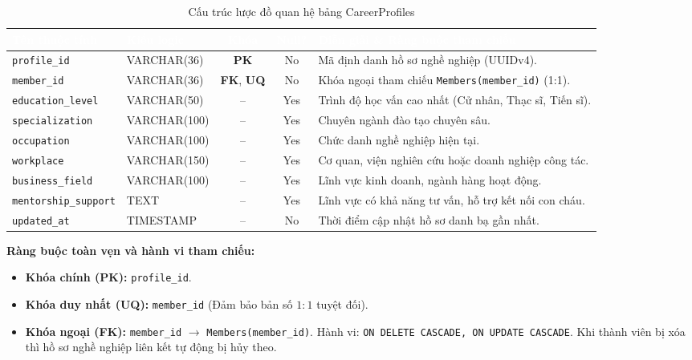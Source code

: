 \begin{table}[H]
    \centering
    \small
    \renewcommand{\arraystretch}{1.2}
    \begin{tabularx}{\textwidth}{p{3.4cm} p{2.6cm} c c X}
        \toprule
        \rowcolor{tableheader}\textcolor{white}{\textbf{Tên thuộc tính}} & \textcolor{white}{\textbf{Kiểu logic}} & \textcolor{white}{\textbf{Khóa}} & \textcolor{white}{\textbf{Null?}} & \textcolor{white}{\textbf{Diễn giải \& Ràng buộc tham chiếu}} \\
        \midrule
        \rowcolor{tablerowalt}
        \texttt{profile\_id} & VARCHAR(36) & \textcolor{pkcolor}{\textbf{PK}} & No & Mã định danh hồ sơ nghề nghiệp (UUIDv4). \\
        \texttt{member\_id} & VARCHAR(36) & \textcolor{fkcolor}{\textbf{FK}}, \textbf{UQ} & No & Khóa ngoại tham chiếu \texttt{Members(member\_id)} (1:1). \\
        \rowcolor{tablerowalt}
        \texttt{education\_level} & VARCHAR(50) & -- & Yes & Trình độ học vấn cao nhất (Cử nhân, Thạc sĩ, Tiến sĩ). \\
        \texttt{specialization} & VARCHAR(100) & -- & Yes & Chuyên ngành đào tạo chuyên sâu. \\
        \rowcolor{tablerowalt}
        \texttt{occupation} & VARCHAR(100) & -- & Yes & Chức danh nghề nghiệp hiện tại. \\
        \texttt{workplace} & VARCHAR(150) & -- & Yes & Cơ quan, viện nghiên cứu hoặc doanh nghiệp công tác. \\
        \rowcolor{tablerowalt}
        \texttt{business\_field} & VARCHAR(100) & -- & Yes & Lĩnh vực kinh doanh, ngành hàng hoạt động. \\
        \texttt{mentorship\_support} & TEXT & -- & Yes & Lĩnh vực có khả năng tư vấn, hỗ trợ kết nối con cháu. \\
        \rowcolor{tablerowalt}
        \texttt{updated\_at} & TIMESTAMP & -- & No & Thời điểm cập nhật hồ sơ danh bạ gần nhất. \\
        \bottomrule
    \end{tabularx}
    \caption{Cấu trúc lược đồ quan hệ bảng CareerProfiles}
    \label{tab:schema_career_profiles}
\end{table}

\noindent\textbf{Ràng buộc toàn vẹn và hành vi tham chiếu:}
\begin{itemize}[noitemsep,topsep=2pt]
    \item \textbf{Khóa chính (PK):} \texttt{profile\_id}.
    \item \textbf{Khóa duy nhất (UQ):} \texttt{member\_id} (Đảm bảo bản số $1:1$ tuyệt đối).
    \item \textbf{Khóa ngoại (FK):} \texttt{member\_id} $\rightarrow$ \texttt{Members(member\_id)}. Hành vi: \texttt{ON DELETE CASCADE, ON UPDATE CASCADE}. Khi thành viên bị xóa thì hồ sơ nghề nghiệp liên kết tự động bị hủy theo.
\end{itemize}

